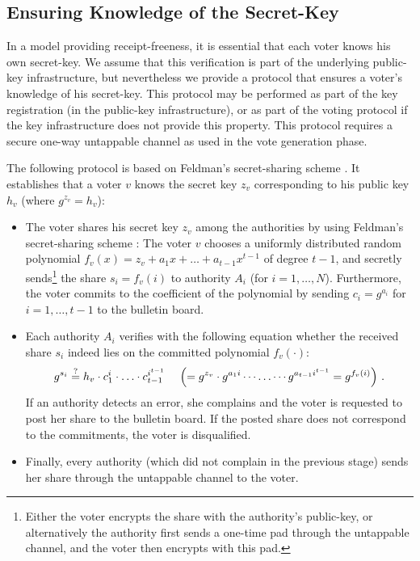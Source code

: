 \documentclass{article}
\begin{document}
\begin{appendix}
\section{Ensuring Knowledge of the Secret-Key}
\label{app:proveSK}

In a model providing receipt-freeness, it is essential that each voter
knows his own secret-key. We assume that this verification is part of the
underlying public-key infrastructure, but nevertheless we provide a
protocol that ensures a voter's  knowledge of his secret-key. This
protocol may be performed as part of the key registration (in the
public-key infrastructure), or as part of the voting protocol if the key
infrastructure does not provide this property. This protocol requires a
secure one-way untappable channel as used in the vote generation phase.

The following protocol is based on Feldman's secret-sharing scheme
\cite{Fel87}. It establishes that a voter $v$ knows the secret key
$z_v$ corresponding to his public key $h_v$ (where $g^{z_v}=h_v$):

\begin{itemize}
\item The voter shares his secret key $z_v$ among the authorities by using
  Feldman's secret-sharing scheme \cite{Fel87}: The voter $v$ chooses a
  uniformly distributed random polynomial
  $f_v(x)=z_v+a_1x+\ldots+a_{t-1}x^{t-1}$ of degree $t-1$, and secretly
  sends\footnote{Either the voter encrypts the share with the authority's
    public-key, or alternatively the authority first sends a one-time pad
    through the untappable channel, and the voter then encrypts with this
    pad.} the share $s_i=f_v(i)$ to authority $A_i$ (for $i=1,\ldots,N$).
  Furthermore, the voter commits to the coefficient of the polynomial by
  sending $c_i=g^{a_i}$ for $i=1,\ldots,t-1$ to the bulletin board.
\item Each authority $A_i$ verifies with the following equation whether the
  received share $s_i$ indeed lies on the committed polynomial $f_v(\cdot)$:
  \[ g^{s_i} \stackrel{?}{=}
       h_v \cdot c_1^i \cdot \ldots \cdot c_{t-1}^{i^{t-1}}
     \ \ \ \ 
     \Bigl( = g^{z_v} \cdot g^{a_1i} \cdots \ldots \cdots g^{a_{t-1}i^{t-1}}
            = g^{f_v(i)} \Bigr)
     \ .
  \]
  If an authority detects an error, she complains and the voter is
  requested to post her share to the bulletin board. If the posted share
  does not correspond to the commitments, the voter is disqualified.
\item Finally, every authority (which did not complain in the previous
  stage) sends her share through the untappable channel to the voter.
\end{itemize}


\end{appendix}
\end{document}
